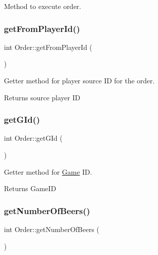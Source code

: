 Method to execute order. 

\mbox{\label{class_order_a1d6ae1f551053272307fde77c2cffa58}} 
\subsubsection{\texorpdfstring{get\+From\+Player\+Id()}{getFromPlayerId()}}
{\footnotesize\ttfamily int Order\+::get\+From\+Player\+Id (\begin{DoxyParamCaption}{ }\end{DoxyParamCaption})}



Getter method for player source ID for the order. 

\begin{DoxyReturn}{Returns}
source player ID 
\end{DoxyReturn}
\mbox{\label{class_order_a89b55df1654ff4cb9db6608fc88c86ed}} 
\subsubsection{\texorpdfstring{get\+G\+Id()}{getGId()}}
{\footnotesize\ttfamily int Order\+::get\+G\+Id (\begin{DoxyParamCaption}{ }\end{DoxyParamCaption})}



Getter method for \hyperlink{class_game}{Game} ID. 

\begin{DoxyReturn}{Returns}
Game\+ID 
\end{DoxyReturn}
\mbox{\label{class_order_a88e86300e6c1b4a21e4ea042b60a7220}} 
\subsubsection{\texorpdfstring{get\+Number\+Of\+Beers()}{getNumberOfBeers()}}
{\footnotesize\ttfamily int Order\+::get\+Number\+Of\+Beers (\begin{DoxyParamCaption}{ }\end{DoxyParamCaption})}



